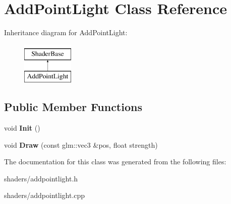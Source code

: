 \hypertarget{classAddPointLight}{\section{\-Add\-Point\-Light \-Class \-Reference}
\label{classAddPointLight}
}
\-Inheritance diagram for \-Add\-Point\-Light\-:\begin{figure}[H]
\begin{center}
\leavevmode
\includegraphics[height=2.000000cm]{classAddPointLight}
\end{center}
\end{figure}
\subsection*{\-Public \-Member \-Functions}
\begin{DoxyCompactItemize}
\item 
\hypertarget{classAddPointLight_a03408127e6be4a0005c364a6c6dc5ca0}{void {\bfseries \-Init} ()}\label{classAddPointLight_a03408127e6be4a0005c364a6c6dc5ca0}

\item 
\hypertarget{classAddPointLight_a816fb5f9e5a595c164f85a0d4b32ce5e}{void {\bfseries \-Draw} (const glm\-::vec3 \&pos, float strength)}\label{classAddPointLight_a816fb5f9e5a595c164f85a0d4b32ce5e}

\end{DoxyCompactItemize}


\-The documentation for this class was generated from the following files\-:\begin{DoxyCompactItemize}
\item 
shaders/addpointlight.\-h\item 
shaders/addpointlight.\-cpp\end{DoxyCompactItemize}
